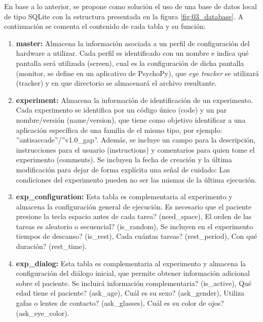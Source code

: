 \documentclass[\main/main.tex]{subfiles}
\begin{document}
		En base a lo anterior, se propone como solución el uso de una base de datos local de tipo SQLite con la estructura presentada en la figura \ref{fig:03_database}. A continuación se comenta el contenido de cada tabla y su función:
		\begin{enumerate}
			\item \textbf{master:} Almacena la información asociada a un perfil de configuración del hardware a utilizar. Cada perfil es identificado con un nombre e indica qué pantalla será utilizada (screen), cual es la configuración de dicha pantalla (monitor, se define en un aplicativo de PsychoPy), que \textit{eye tracker} se utilizará (tracker) y en que directorio se almacenará el archivo resultante.

			\item \textbf{experiment:} Almacena la información de identificación de un experimento. Cada experimento se identifica por un código único (code) y un par nombre/versión (name/version), que tiene como objetivo identificar a una aplicación específica de una familia de el mismo tipo, por ejemplo: ''antisaccade''/''v1.0\_gap''. Además, se incluye un campo para la descripción, instrucciones para el usuario (instructions) y comentarios para quien tome el experimento (comments). Se incluyen la fecha de creación y la última modificación para dejar de forma explícita una señal de cuidado: Las condiciones del experimento pueden no ser las mismas de la última ejecución.
			
			\item \textbf{exp\_configuration:} Esta tabla es complementaria al experimento y almacena la configuración general de ejecución. \textquestiondown Es necesario que el paciente presione la tecla espacio antes de cada tarea? (need\_space), \textquestiondown El orden de las tareas es aleatorio o secuencial? (is\_random), \textquestiondown Se incluyen en el experimento tiempos de descanso? (is\_rest), \textquestiondown Cada cuántas tareas? (rest\_period), \textquestiondown Con qué duración? (rest\_time).

			\item \textbf{exp\_dialog:} Esta tabla es complementaria al experimento y almacena la configuración del diálogo inicial, que permite obtener información adicional sobre el paciente. \textquestiondown Se incluirá información complementaria? (is\_active), \textquestiondown Qué edad tiene el paciente? (ask\_age), \textquestiondown Cuál es su sexo? (ask\_gender), \textquestiondown Utiliza gafas o lentes de contacto? (ask\_glasses), \textquestiondown Cuál es su color de ojos? (ask\_eye\_color).


\end{enumerate}
\end{document}
